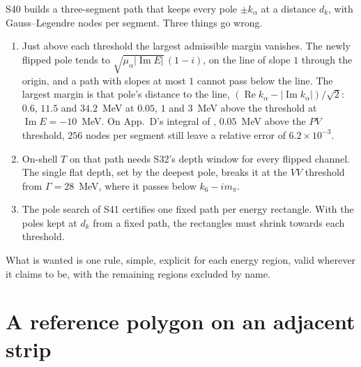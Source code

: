 \documentclass[11pt]{article}
\begin{document}
S40 builds a three-segment path that keeps every pole $\pm k_\alpha$ at a distance $d_k$, with Gauss--Legendre nodes per segment. Three things go wrong.
\begin{enumerate}
\item Just above each threshold the largest admissible margin vanishes. The newly flipped pole tends to $\sqrt{\mu_\alpha|\operatorname{Im}E|}\,(1-i)$, on the line of slope $1$ through the origin, and a path with slopes at most $1$ cannot pass below the line. The largest margin is that pole's distance to the line, $(\operatorname{Re}k_\alpha-|\operatorname{Im}k_\alpha|)/\sqrt2$: $0.6$, $11.5$ and $34.2$~MeV at $0.05$, $1$ and $3$~MeV above the threshold at $\operatorname{Im}E=-10$~MeV. On App.~D's integral of \cite{Wu:2026wxb}, $0.05$~MeV above the $PV$ threshold, $256$ nodes per segment still leave a relative error of $6.2\times10^{-3}$.
\item On-shell $T$ on that path needs S32's depth window for every flipped channel. The single flat depth, set by the deepest pole, breaks it at the $VV$ threshold from $\Gamma=28$~MeV, where it passes below $k_6-im_\pi$.
\item The pole search of S41 certifies one fixed path per energy rectangle. With the poles kept at $d_k$ from a fixed path, the rectangles must shrink towards each threshold.
\end{enumerate}
What is wanted is one rule, simple, explicit for each energy region, valid wherever it claims to be, with the remaining regions excluded by name.

\section{A reference polygon on an adjacent strip}
\end{document}
